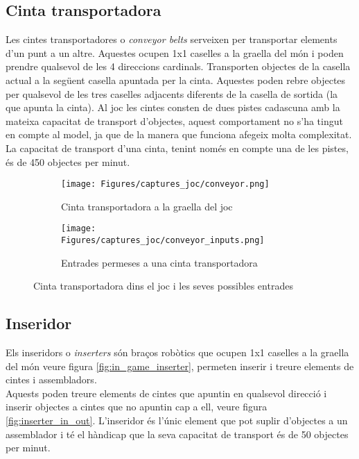 \subsection{Cinta transportadora}
Les cintes transportadores o \textit{conveyor belts} serveixen per transportar elements d'un punt a un altre. Aquestes ocupen 1x1 caselles a la graella del món i poden prendre qualsevol de les 4 direccions cardinals. Transporten objectes de la casella actual a la següent casella apuntada per la cinta. Aquestes poden rebre objectes per qualsevol de les tres caselles adjacents diferents de la casella de sortida (la que apunta la cinta).
Al joc les cintes consten de dues pistes cadascuna amb la mateixa capacitat de transport d'objectes, aquest comportament no s'ha tingut en compte al model, ja que de la manera que funciona afegeix molta complexitat.
La capacitat de transport d'una cinta, tenint només en compte una de les pistes, és de 450 objectes per minut.
\begin{figure}[ht]
    \centering
    \begin{subfigure}{0.45\textwidth}
        \texttt{[image: Figures/captures\_joc/conveyor.png]}
        \caption{Cinta transportadora a la graella del joc}
    \end{subfigure}
    \hfill
    \begin{subfigure}{0.45\textwidth}
        \texttt{[image: Figures/captures\_joc/conveyor\_inputs.png]}
        \caption{Entrades permeses a una cinta transportadora}
    \end{subfigure}
    \caption{Cinta transportadora dins el joc i les seves possibles entrades}
    \label{fig:conveyor_in_out}
\end{figure}

\subsection{Inseridor}
Els inseridors o \textit{inserters} són braços robòtics que ocupen 1x1 caselles a la graella del món veure figura \ref{fig:in_game_inserter}, permeten inserir i treure elements de cintes i assembladors.\\
Aquests poden treure elements de cintes que apuntin en qualsevol direcció i inserir objectes a cintes que no apuntin cap a ell, veure figura \ref{fig:inserter_in_out}. L'inseridor és l'únic element que pot suplir d'objectes a un assemblador i té el hàndicap que la seva capacitat de transport és de 50 objectes per minut.

